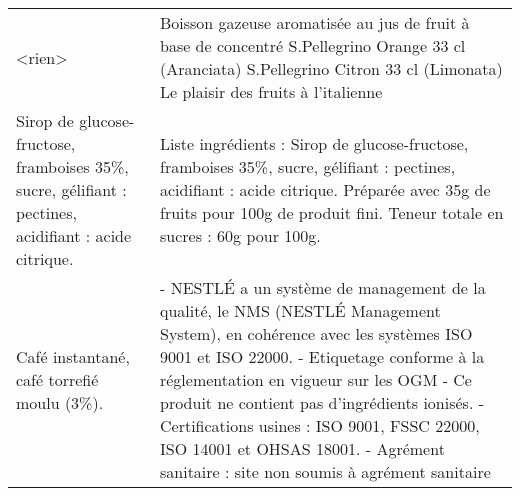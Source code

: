 \begin{longtable}{p{7cm}p{7cm}}
                                                                                                                                                                                                                                                                                                 <rien> &                                                                                                                                                                                                                                                                                        Boisson gazeuse aromatisée au jus de fruit à base de concentré \newline S.Pellegrino Orange 33 cl (Aranciata) \newline S.Pellegrino Citron 33 cl (Limonata) \newline Le plaisir des fruits à l’italienne \\
                                                                                                                                                                                                   Sirop de glucose-fructose, framboises 35\%, sucre, gélifiant : pectines, acidifiant : acide citrique. &                                                                                                                                                                                                                                           Liste ingrédients : Sirop de glucose-fructose, framboises 35\%, sucre, gélifiant : pectines, acidifiant :  \newline acide citrique. \newline Préparée avec 35g de fruits pour 100g de produit fini.  \newline Teneur totale en sucres : 60g pour 100g. \\
                                                                                                                                                                                                                                                             Café instantané, café torrefié moulu (3\%). &                                                          - NESTLÉ a un système de management de la qualité, le NMS (NESTLÉ  \newline Management System), en cohérence avec les systèmes ISO 9001 et ISO 22000. \newline - Etiquetage conforme à la réglementation en vigueur sur les OGM  \newline - Ce produit ne contient pas d'ingrédients ionisés. \newline - Certifications usines :  ISO 9001, FSSC 22000, ISO 14001 et OHSAS 18001. \newline - Agrément sanitaire : site non soumis à agrément sanitaire \\

\end{longtable}
